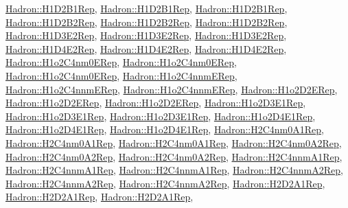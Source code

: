 \mbox{\hyperlink{structHadron_1_1H1D2B1Rep}{Hadron\+::\+H1\+D2\+B1\+Rep}}, \mbox{\hyperlink{structHadron_1_1H1D2B1Rep}{Hadron\+::\+H1\+D2\+B1\+Rep}}, \mbox{\hyperlink{structHadron_1_1H1D2B1Rep}{Hadron\+::\+H1\+D2\+B1\+Rep}}, \mbox{\hyperlink{structHadron_1_1H1D2B2Rep}{Hadron\+::\+H1\+D2\+B2\+Rep}}, \mbox{\hyperlink{structHadron_1_1H1D2B2Rep}{Hadron\+::\+H1\+D2\+B2\+Rep}}, \mbox{\hyperlink{structHadron_1_1H1D2B2Rep}{Hadron\+::\+H1\+D2\+B2\+Rep}}, \mbox{\hyperlink{structHadron_1_1H1D3E2Rep}{Hadron\+::\+H1\+D3\+E2\+Rep}}, \mbox{\hyperlink{structHadron_1_1H1D3E2Rep}{Hadron\+::\+H1\+D3\+E2\+Rep}}, \mbox{\hyperlink{structHadron_1_1H1D3E2Rep}{Hadron\+::\+H1\+D3\+E2\+Rep}}, \mbox{\hyperlink{structHadron_1_1H1D4E2Rep}{Hadron\+::\+H1\+D4\+E2\+Rep}}, \mbox{\hyperlink{structHadron_1_1H1D4E2Rep}{Hadron\+::\+H1\+D4\+E2\+Rep}}, \mbox{\hyperlink{structHadron_1_1H1D4E2Rep}{Hadron\+::\+H1\+D4\+E2\+Rep}}, \mbox{\hyperlink{structHadron_1_1H1o2C4nm0ERep}{Hadron\+::\+H1o2\+C4nm0\+E\+Rep}}, \mbox{\hyperlink{structHadron_1_1H1o2C4nm0ERep}{Hadron\+::\+H1o2\+C4nm0\+E\+Rep}}, \mbox{\hyperlink{structHadron_1_1H1o2C4nm0ERep}{Hadron\+::\+H1o2\+C4nm0\+E\+Rep}}, \mbox{\hyperlink{structHadron_1_1H1o2C4nnmERep}{Hadron\+::\+H1o2\+C4nnm\+E\+Rep}}, \mbox{\hyperlink{structHadron_1_1H1o2C4nnmERep}{Hadron\+::\+H1o2\+C4nnm\+E\+Rep}}, \mbox{\hyperlink{structHadron_1_1H1o2C4nnmERep}{Hadron\+::\+H1o2\+C4nnm\+E\+Rep}}, \mbox{\hyperlink{structHadron_1_1H1o2D2ERep}{Hadron\+::\+H1o2\+D2\+E\+Rep}}, \mbox{\hyperlink{structHadron_1_1H1o2D2ERep}{Hadron\+::\+H1o2\+D2\+E\+Rep}}, \mbox{\hyperlink{structHadron_1_1H1o2D2ERep}{Hadron\+::\+H1o2\+D2\+E\+Rep}}, \mbox{\hyperlink{structHadron_1_1H1o2D3E1Rep}{Hadron\+::\+H1o2\+D3\+E1\+Rep}}, \mbox{\hyperlink{structHadron_1_1H1o2D3E1Rep}{Hadron\+::\+H1o2\+D3\+E1\+Rep}}, \mbox{\hyperlink{structHadron_1_1H1o2D3E1Rep}{Hadron\+::\+H1o2\+D3\+E1\+Rep}}, \mbox{\hyperlink{structHadron_1_1H1o2D4E1Rep}{Hadron\+::\+H1o2\+D4\+E1\+Rep}}, \mbox{\hyperlink{structHadron_1_1H1o2D4E1Rep}{Hadron\+::\+H1o2\+D4\+E1\+Rep}}, \mbox{\hyperlink{structHadron_1_1H1o2D4E1Rep}{Hadron\+::\+H1o2\+D4\+E1\+Rep}}, \mbox{\hyperlink{structHadron_1_1H2C4nm0A1Rep}{Hadron\+::\+H2\+C4nm0\+A1\+Rep}}, \mbox{\hyperlink{structHadron_1_1H2C4nm0A1Rep}{Hadron\+::\+H2\+C4nm0\+A1\+Rep}}, \mbox{\hyperlink{structHadron_1_1H2C4nm0A1Rep}{Hadron\+::\+H2\+C4nm0\+A1\+Rep}}, \mbox{\hyperlink{structHadron_1_1H2C4nm0A2Rep}{Hadron\+::\+H2\+C4nm0\+A2\+Rep}}, \mbox{\hyperlink{structHadron_1_1H2C4nm0A2Rep}{Hadron\+::\+H2\+C4nm0\+A2\+Rep}}, \mbox{\hyperlink{structHadron_1_1H2C4nm0A2Rep}{Hadron\+::\+H2\+C4nm0\+A2\+Rep}}, \mbox{\hyperlink{structHadron_1_1H2C4nnmA1Rep}{Hadron\+::\+H2\+C4nnm\+A1\+Rep}}, \mbox{\hyperlink{structHadron_1_1H2C4nnmA1Rep}{Hadron\+::\+H2\+C4nnm\+A1\+Rep}}, \mbox{\hyperlink{structHadron_1_1H2C4nnmA1Rep}{Hadron\+::\+H2\+C4nnm\+A1\+Rep}}, \mbox{\hyperlink{structHadron_1_1H2C4nnmA2Rep}{Hadron\+::\+H2\+C4nnm\+A2\+Rep}}, \mbox{\hyperlink{structHadron_1_1H2C4nnmA2Rep}{Hadron\+::\+H2\+C4nnm\+A2\+Rep}}, \mbox{\hyperlink{structHadron_1_1H2C4nnmA2Rep}{Hadron\+::\+H2\+C4nnm\+A2\+Rep}}, \mbox{\hyperlink{structHadron_1_1H2D2A1Rep}{Hadron\+::\+H2\+D2\+A1\+Rep}}, \mbox{\hyperlink{structHadron_1_1H2D2A1Rep}{Hadron\+::\+H2\+D2\+A1\+Rep}}, \mbox{\hyperlink{structHadron_1_1H2D2A1Rep}{Hadron\+::\+H2\+D2\+A1\+Rep}}, 